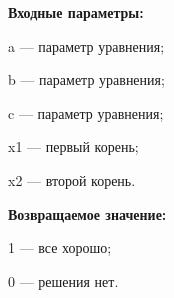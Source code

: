 \textbf{Входные параметры:}
 
a --- параметр уравнения;
 
b --- параметр уравнения;
 
c --- параметр уравнения;
 
x1 --- первый корень;
 
x2 --- второй корень.

\textbf{Возвращаемое значение:}
 
1 --- все хорошо;
 
0 --- решения нет.
